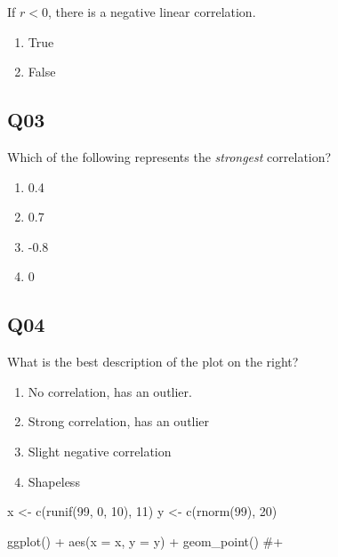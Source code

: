 \documentclass[
  letterpaper,
  DIV=11,
  numbers=noendperiod]{scrreprt}
\newenvironment{Shaded}{\begin{snugshade}}{\end{snugshade}}
\newcommand{\AttributeTok}[1]{\textcolor[rgb]{0.40,0.45,0.13}{#1}}
\newcommand{\CommentTok}[1]{\textcolor[rgb]{0.37,0.37,0.37}{#1}}
\newcommand{\DecValTok}[1]{\textcolor[rgb]{0.68,0.00,0.00}{#1}}
\newcommand{\FunctionTok}[1]{\textcolor[rgb]{0.28,0.35,0.67}{#1}}
\newcommand{\NormalTok}[1]{\textcolor[rgb]{0.00,0.23,0.31}{#1}}
\newcommand{\OtherTok}[1]{\textcolor[rgb]{0.00,0.23,0.31}{#1}}
\newcommand{\SpecialCharTok}[1]{\textcolor[rgb]{0.37,0.37,0.37}{#1}}
\providecommand{\tightlist}{%
  \setlength{\itemsep}{0pt}\setlength{\parskip}{0pt}}\usepackage{longtable,booktabs,array}
\begin{document}
If \(r < 0\), there is a negative linear correlation.

\begin{enumerate}
\def\labelenumi{\arabic{enumi}.}
\tightlist
\item
  True
\item
  False
\end{enumerate}

\hypertarget{q03}{%
\subsection{Q03}\label{q03}}

Which of the following represents the \emph{strongest} correlation?

\begin{enumerate}
\def\labelenumi{\arabic{enumi}.}
\tightlist
\item
  0.4
\item
  0.7
\item
  -0.8
\item
  0
\end{enumerate}

\hypertarget{q04}{%
\subsection{Q04}\label{q04}}

\vspace{1cm}

What is the best description of the plot on the right?

\begin{enumerate}
\def\labelenumi{\arabic{enumi}.}
\tightlist
\item
  No correlation, has an outlier.
\item
  Strong correlation, has an outlier
\item
  Slight negative correlation
\item
  Shapeless
\end{enumerate}

\begin{Shaded}
\begin{Highlighting}[]
\NormalTok{x }\OtherTok{\textless{}{-}} \FunctionTok{c}\NormalTok{(}\FunctionTok{runif}\NormalTok{(}\DecValTok{99}\NormalTok{, }\DecValTok{0}\NormalTok{, }\DecValTok{10}\NormalTok{), }\DecValTok{11}\NormalTok{)}
\NormalTok{y }\OtherTok{\textless{}{-}} \FunctionTok{c}\NormalTok{(}\FunctionTok{rnorm}\NormalTok{(}\DecValTok{99}\NormalTok{), }\DecValTok{20}\NormalTok{)}

\FunctionTok{ggplot}\NormalTok{() }\SpecialCharTok{+} \FunctionTok{aes}\NormalTok{(}\AttributeTok{x =}\NormalTok{ x, }\AttributeTok{y =}\NormalTok{ y) }\SpecialCharTok{+} \FunctionTok{geom\_point}\NormalTok{() }\CommentTok{\#+ }
\end{Highlighting}
\end{Shaded}
\end{document}
